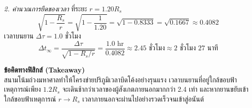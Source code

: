 \begin{psctexample}
\textit{2. คำนวณการยืดของเวลา}
ที่ระยะ $r = 1.20 R_s$
\begin{equation}
\sqrt{1 - \frac{R_s}{r}} = \sqrt{1 - \frac{1}{1.20}} = \sqrt{1 - 0.8333} = \sqrt{0.1667} \approx 0.4082
\end{equation}
เวลาบนยาน $\Delta \tau = 1.0\text{ ชั่วโมง}$
\begin{equation}
\Delta t_\infty = \frac{\Delta \tau}{\sqrt{1 - R_s/r}} = \frac{1.0\text{ hr}}{0.4082} \approx 2.45\text{ ชั่วโมง} \approx 2\text{ ชั่วโมง } 27\text{ นาที}
\end{equation}

\textbf{ข้อคิดทางฟิสิกส์ (Takeaway)} \\
สนามโน้มถ่วงมหาศาลทำให้โครงข่ายปริภูมิเวลาบิดโค้งอย่างรุนแรง เวลาบนยานที่อยู่ใกล้ขอบฟ้าเหตุการณ์เพียง $1.2 R_s$ จะเดินช้ากว่าเวลาของผู้สังเกตภายนอกมากกว่า 2.4 เท่า และหากยานขยับเข้าใกล้ขอบฟ้าเหตุการณ์ $r \to R_s$ เวลาภายนอกจะผ่านไปอย่างรวดเร็วจนเข้าสู่อนันต์
\qedexam
\end{psctexample}

